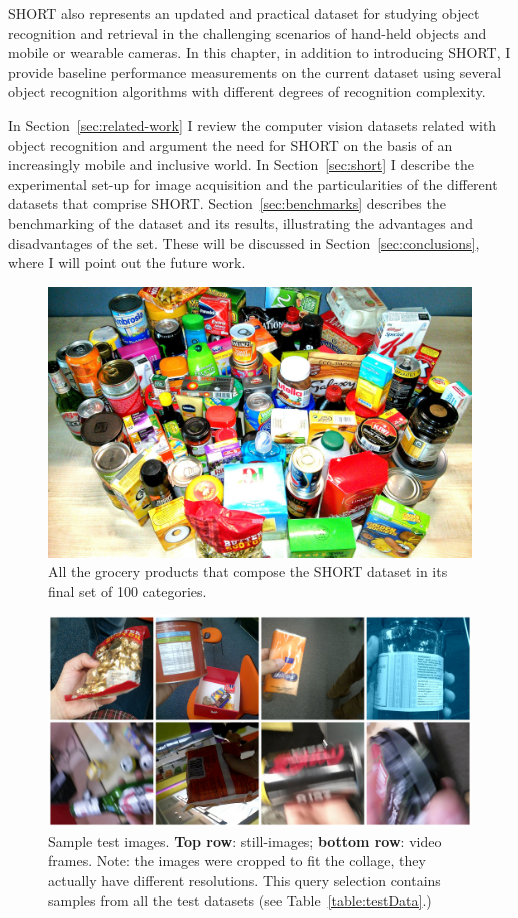 SHORT also represents an updated and practical dataset for studying object recognition and retrieval in the challenging scenarios of hand-held objects and mobile or wearable cameras. In this chapter, in addition to introducing SHORT, I provide baseline performance measurements on the current dataset using several object recognition algorithms with different degrees of recognition complexity.

In Section~\ref{sec:related-work} I review the computer vision datasets related with object recognition and argument the need for SHORT on the basis of an increasingly mobile and inclusive world. In Section~\ref{sec:short} I describe the experimental set-up for image acquisition and the particularities of the different datasets that comprise SHORT. Section~\ref{sec:benchmarks} describes the benchmarking of the dataset and its results, illustrating the advantages and disadvantages of the set. These will be discussed in Section~\ref{sec:conclusions}, where I will point out the future work.

\begin{figure}[h!]
\centering
\includegraphics[width=\textwidth]{./gfx/Chapter03/SHORT_family_photo.jpg}
\caption{All the grocery products that compose the SHORT dataset in its final set of 100 categories.}
\label{fig:short-100-all}
\end{figure}


\begin{figure}
\centering
\includegraphics[width=.75\linewidth]{./gfx/Chapter03/icip-test-imgs2.jpg}
\caption{Sample test images. \textbf{Top row}: still-images; \textbf{bottom row}: video frames. Note: the images were cropped to fit the collage, they actually have different resolutions. This query selection contains samples from all the test datasets (see Table~\ref{table:testData}.)}
\label{fig:short-30test}
\end{figure}


